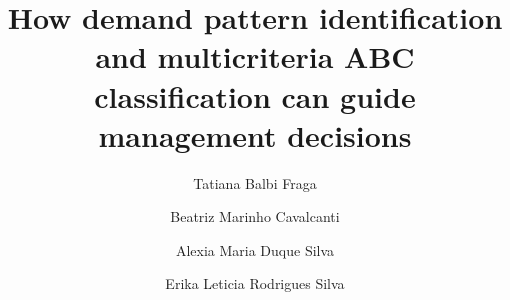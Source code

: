 \documentclass[authoryear,manuscript,12pt]{elsarticle}
\begin{document}
\begin{frontmatter}


\title{How demand pattern identification and multicriteria ABC classification can guide management decisions}



\author{Tatiana Balbi Fraga}

\author{Beatriz Marinho Cavalcanti}

\author{Alexia Maria Duque Silva}

\author{Erika Leticia Rodrigues Silva}



\end{frontmatter}
\end{document}
